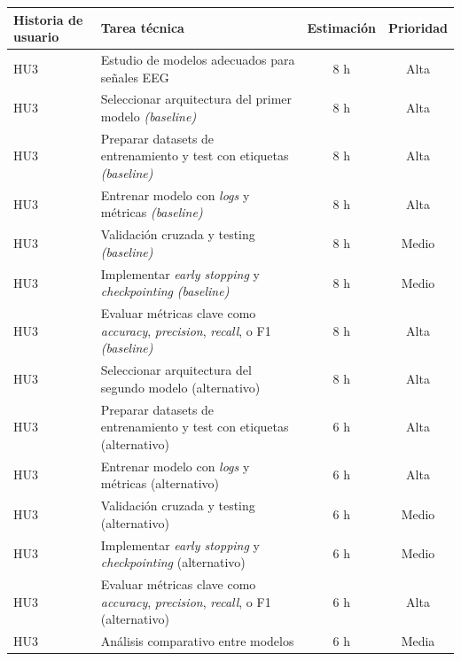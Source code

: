 \documentclass[
11pt, %
]{charter}
\begin{document}
\begin{table}[htpb]
\begin{tabularx}{\linewidth}{@{}|X|X|c|c|@{}}
\end{tabularx}
\end{table}

\begin{table}[htpb]
\centering
\begin{tabularx}{\linewidth}{@{}|X|X|c|c|@{}}
\hline
\rowcolor[HTML]{C0C0C0}
Historia de usuario & Tarea técnica & Estimación & Prioridad \\ \hline
HU3 & Estudio de modelos adecuados para señales EEG					 & 8 h & Alta \\ \hline
HU3 & Seleccionar arquitectura del primer modelo \textit{(baseline)}					 & 8 h & Alta \\ \hline
HU3 & Preparar datasets de entrenamiento y test con etiquetas \textit{(baseline)}					 & 8 h & Alta \\ \hline
HU3 & Entrenar modelo con \textit{logs} y métricas	 \textit{(baseline)}					 & 8 h & Alta \\ \hline
HU3 & Validación cruzada y testing \textit{(baseline)}			 & 8 h & Medio \\ \hline
HU3 & Implementar \textit{early stopping} y \textit{checkpointing}	 \textit{(baseline)}			 & 8 h & Medio \\ \hline
HU3 & Evaluar métricas clave como \textit{accuracy}, \textit{precision}, \textit{recall}, o F1 \textit{(baseline)}					 & 8 h & Alta \\ \hline
HU3 & Seleccionar arquitectura del segundo modelo  (alternativo)					 & 8 h & Alta \\ \hline
HU3 & Preparar datasets de entrenamiento y test con etiquetas (alternativo)					 & 6 h & Alta \\ \hline
HU3 & Entrenar modelo con \textit{logs} y métricas	 (alternativo)					 & 6 h & Alta \\ \hline
HU3 & Validación cruzada y testing (alternativo)			 & 6 h & Medio \\ \hline
HU3 & Implementar \textit{early stopping} y \textit{checkpointing}	 (alternativo)			 & 6 h & Medio \\ \hline
HU3 & Evaluar métricas clave como \textit{accuracy}, \textit{precision}, \textit{recall}, o F1 (alternativo)					 & 6 h & Alta \\ \hline
HU3 & Análisis comparativo entre modelos				 & 6 h & Media \\ \hline


\end{tabularx}
\end{table}
\end{document}
